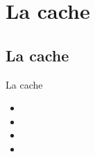 \section{La cache}

\subsection{La cache}
\begin{frame}{La cache}
  \begin{itemize}
    \item 
    \item 
    \item 
    \item 
  \end{itemize}
\end{frame}
